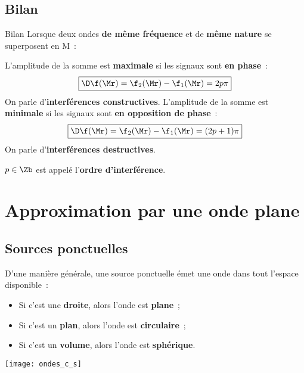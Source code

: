 \documentclass[../main/main.tex]{subfiles}
\begin{document}
\subsection{Bilan}

\begin{NCror}{Bilan}
    Lorsque deux ondes \textbf{de même fréquence} et de \textbf{même nature} se
    superposent en M~:
    \begin{rorside}
        L'amplitude de la somme est \textbf{maximale} si les signaux sont
        \textbf{en phase}~:
        \[\boxed{\D\f(\Mr) = \f_2(\Mr)-\f_1(\Mr) = 2p\pi}\]
        On parle d'\textbf{interférences constructives}.
        \tcblower
        L'amplitude de la somme est \textbf{minimale} si les signaux sont
        \textbf{en opposition de phase}~:
        \[\boxed{\D\f(\Mr) = \f_2(\Mr)-\f_1(\Mr) = (2p+1)\pi}\]
        On parle d'\textbf{interférences destructives}.
    \end{rorside}
    \centering$p\in\Zb$ est appelé l'\textbf{ordre d'interférence}.
\end{NCror}

\section{Approximation par une onde plane}
\subsection{Sources ponctuelles}
\begin{minipage}{0.55\linewidth}
    D'une manière générale, une source ponctuelle émet une onde dans tout l'espace
    disponible~:
    \begin{itemize}
        \item Si c'est une \textbf{droite}, alors l'onde est \textbf{plane}~;
        \item Si c'est un \textbf{plan}, alors l'onde est \textbf{circulaire}~;
        \item Si c'est un \textbf{volume}, alors l'onde est \textbf{sphérique}.
    \end{itemize}
\end{minipage}
\hfill
\begin{minipage}{0.35\linewidth}
    \begin{center}
        \texttt{[image: ondes\_c\_s]}
    \end{center}
\end{minipage}\bigbreak
\end{document}
